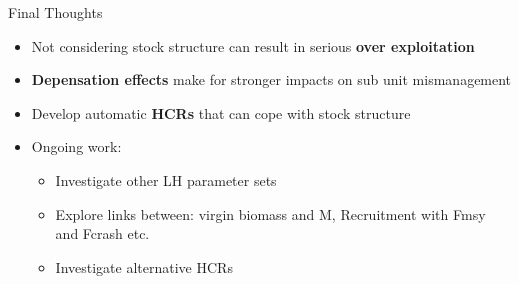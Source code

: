 \documentclass{beamer}
\begin{document}



\begin{frame}{Final Thoughts}
  \begin{itemize}
    \item Not considering stock structure can result in serious \textbf{over exploitation}
    \item \textbf{Depensation effects} make for stronger impacts on sub unit mismanagement
    \item Develop automatic \textbf{HCRs} that can cope with stock structure
    \item Ongoing work:    
     \begin{itemize}
      \item Investigate other LH parameter sets
      \item Explore links between: virgin biomass and M, Recruitment with Fmsy and Fcrash etc. 
      \item Investigate alternative HCRs
     \end{itemize}         
  \end{itemize}
\end{frame}

\end{document}
